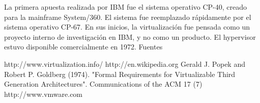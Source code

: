 La primera apuesta realizada por IBM fue el sistema operativo CP-40, creado para la mainframe System/360. El sistema fue reemplazado rápidamente por el sistema operativo CP-67. En sus inicios, la virtualización fue pensada como un proyecto interno de investigación en IBM, y no como un producto. El hypervisor estuvo disponible comercialmente en 1972.
Fuentes

http://www.virtualization.info/
http://en.wikipedia.org
Gerald J. Popek and Robert P. Goldberg (1974). "Formal Requirements for Virtualizable Third Generation Architectures". Communications of the ACM 17 (7)
http://www.vmware.com
